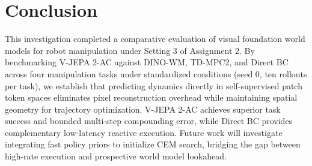 \documentclass[10pt,journal,compsoc]{IEEEtran}
\begin{document}
\section{Conclusion}

This investigation completed a comparative evaluation of visual foundation world models for robot manipulation under Setting 3 of Assignment 2. By benchmarking V-JEPA 2-AC against DINO-WM, TD-MPC2, and Direct BC across four manipulation tasks under standardized conditions (seed 0, ten rollouts per task), we establish that predicting dynamics directly in self-supervised patch token spaces eliminates pixel reconstruction overhead while maintaining spatial geometry for trajectory optimization. V-JEPA 2-AC achieves superior task success and bounded multi-step compounding error, while Direct BC provides complementary low-latency reactive execution. Future work will investigate integrating fast policy priors to initialize CEM search, bridging the gap between high-rate execution and prospective world model lookahead.



\end{document}
